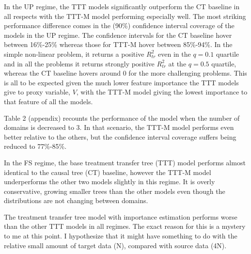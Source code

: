 \documentclass[a4paper,12pt]{article}
\theoremstyle{proposition}
\begin{document}
In the UP regime, the TTT models significantly outperform the CT baseline in all respects with the TTT-M model performing especially well. The most striking performance difference comes in the (90\%) confidence interval coverage of the models in the UP regime. The confidence intervals for the CT baseline hover between 16\%-25\% whereas those for TTT-M hover between 85\%-94\%. In the simple non-linear problem, it returns a positive $R^2_{tr}$ even in the $q=0.1$ quartile and in all the problems it returns strongly positive $R^2_{tr}$ at the $q=0.5$ quartile, whereas the CT baseline hovers around 0 for the more challenging problems. This is all to be expected given the much lower feature importance the TTT models give to proxy variable, $V$, with the TTT-M model giving the lowest importance to that feature of all the models.

Table 2 (appendix) recounts the performance of the model when the number of domains is decreased to 3. In that scenario, the TTT-M model performs even better relative to the others, but the confidence interval coverage suffers being reduced to 77\%-85\%.

In the FS regime, the base treatment transfer tree (TTT) model performs almost identical to the causal tree (CT) baseline, however the TTT-M model underperforms the other two models slightly in this regime. It is overly conservative, growing smaller trees than the other models even though the distributions are not changing between domains.

The treatment transfer tree model with importance estimation performs worse than the other TTT models in all regimes. The exact reason for this is a mystery to me at this point. I hypothesize that it might have something to do with the relative small amount of target data (N), compared with source data (4N).
\end{document}
